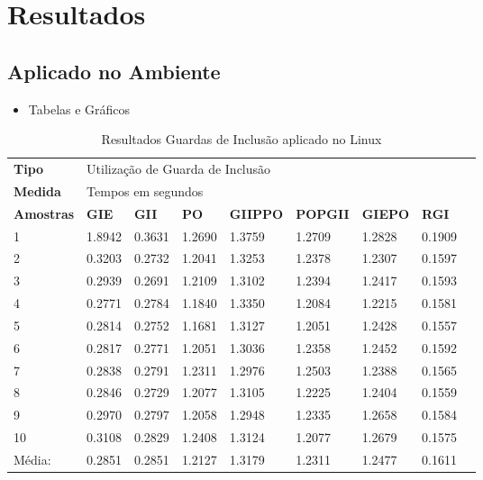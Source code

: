 \chapter[Resultados]{Resultados}


\section{Aplicado no Ambiente}

\begin{itemize}
    \item Tabelas e Gráficos
\end{itemize}

\begin{table}[!ht]
\centering
\caption{Resultados Guardas de Inclusão aplicado no Linux}
\label{tab:resutados_guards_de_inclusao:linux}
\begin{tiny}
\begin{tabular}{lp{1cm}p{1cm}p{1cm}p{1cm}p{1cm}p{1cm}p{1cm}p{1cm}}
\textbf{Tipo} & \multicolumn{7}{l}{Utilização de Guarda de Inclusão} \\
\textbf{Medida} & \multicolumn{7}{l}{Tempos em segundos } \\
\textbf{Amostras} & \textbf{GIE} & \textbf{GII} & \textbf{PO} & 
\textbf{GIIPPO} & \textbf{POPGII} & \textbf{GIEPO} & \textbf{RGI} \\ \toprule
 1      & 1.8942     & 0.3631  & 1.2690    & 1.3759    & 1.2709  & 1.2828     & 0.1909 \\
 2      & 0.3203     & 0.2732  & 1.2041    & 1.3253    & 1.2378  & 1.2307     & 0.1597 \\
 3      & 0.2939     & 0.2691  & 1.2109    & 1.3102    & 1.2394  & 1.2417     & 0.1593 \\
 4      & 0.2771     & 0.2784  & 1.1840    & 1.3350    & 1.2084  & 1.2215     & 0.1581 \\
 5      & 0.2814     & 0.2752  & 1.1681    & 1.3127    & 1.2051  & 1.2428     & 0.1557 \\
 6      & 0.2817     & 0.2771  & 1.2051    & 1.3036    & 1.2358  & 1.2452     & 0.1592 \\
 7      & 0.2838     & 0.2791  & 1.2311    & 1.2976    & 1.2503  & 1.2388     & 0.1565 \\
 8      & 0.2846     & 0.2729  & 1.2077    & 1.3105    & 1.2225  & 1.2404     & 0.1559 \\
 9      & 0.2970     & 0.2797  & 1.2058    & 1.2948    & 1.2335  & 1.2658     & 0.1584  \\
 10     & 0.3108     & 0.2829  & 1.2408    & 1.3124    & 1.2077  & 1.2679     & 0.1575  \\ \bottomrule
 Média: & 0.2851     & 0.2851  & 1.2127    & 1.3179    & 1.2311  & 1.2477     & 0.1611 \\
\end{tabular}
\end{tiny}
\end{table}

